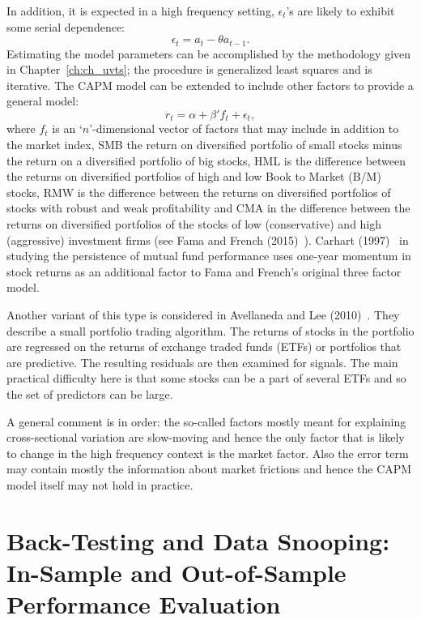 In addition, it is expected in a high frequency setting, $\epsilon_t$'s are likely to exhibit some serial dependence:
	\begin{equation} \label{eqn:et}
	\epsilon_t = a_t - \theta a_{t-1}.
	\end{equation}
Estimating the model parameters can be accomplished by the methodology given in Chapter~\ref{ch:ch_uvts}; the procedure is generalized least squares and is iterative. The CAPM model can be extended to include other factors to provide a general model:
	\begin{equation} \label{eqn:rtalpha}
	r_t = \alpha + \beta'f_{t} + \epsilon_t,
	\end{equation}
where $f_t$ is an `$n$'-dimensional vector of factors that may include in addition to the market index, SMB the return on diversified portfolio of small stocks minus the return on a diversified portfolio of big stocks, HML is the difference between the returns on diversified portfolios of high and low Book to Market (B/M) stocks, RMW is the difference between the returns on diversified portfolios of stocks with robust and weak profitability and CMA in the difference between the returns on diversified portfolios of the stocks of low (conservative) and high (aggressive) investment firms (see Fama and French (2015)~\cite{fama2015}). Carhart (1997)~\cite{carhart1997persistence} in studying the persistence of mutual fund performance uses one-year momentum in stock returns as an additional factor to Fama and French's original three factor model.


Another variant of this type is considered in Avellaneda and Lee (2010)~\cite{avellee}. They describe a small portfolio trading algorithm. The returns of stocks in the portfolio are regressed on the returns of exchange traded funds (ETFs) or portfolios that are predictive. The resulting residuals are then examined for signals. The main practical difficulty here is that some stocks can be a part of several ETFs and so the set of predictors can be large. 


A general comment is in order: the so-called factors mostly meant for explaining cross-sectional variation are slow-moving and hence the only factor that is likely to change in the high frequency context is the market factor. Also the error term may contain mostly the information about market frictions and hence the CAPM model itself may not hold in practice. \label{in:fvm2}



\section{Back-Testing and Data Snooping:  In-Sample and Out-of-Sample Performance Evaluation} \label{in:back1}

